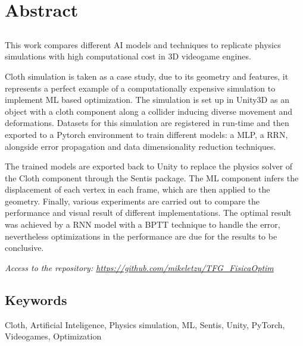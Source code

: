 \chapter*{Abstract}

\section*{\tituloPortadaEngVal}
This work compares different AI models and techniques to replicate physics simulations with high computational cost in 3D videogame engines. \newline

Cloth simulation is taken as a case study, due to its geometry and features, it represents a perfect example of a computationally expensive simulation to implement ML based optimization. The simulation is set up in Unity3D as an object with a cloth component along a collider inducing diverse movement and deformations. Datasets for this simulation are registered in run-time and then exported to a Pytorch environment to train different models: a MLP, a RRN, alongside error propagation and data dimensionality reduction techniques.

The trained models are exported back to Unity to replace the physics solver of the Cloth component through the Sentis package. The ML component infers the displacement of each vertex in each frame, which are then applied to the geometry. Finally, various experiments are carried out to compare the performance and visual result of different implementations. The optimal result was achieved by a RNN model with a BPTT technique to handle the error, nevertheless optimizations in the performance are due for the results to be conclusive.\newline

\textit{Access to the repository: \url{https://github.com/mikeletzu/TFG_FisicaOptim}}

\section*{Keywords}

\noindent Cloth, Artificial Inteligence, Physics simulation, ML, Sentis, Unity, PyTorch, Videogames, Optimization